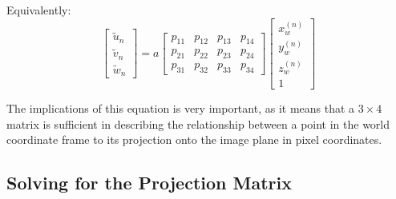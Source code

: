 Equivalently:
\begin{equation} \label{eq:proj}
    \begin{bmatrix}
        \widetilde{u}_n \\ \widetilde{v}_n \\ \widetilde{w}_n
    \end{bmatrix}
    =
    a
    \begin{bmatrix}
        p_{11} & p_{12} & p_{13} & p_{14} \\
        p_{21} & p_{22} & p_{23} & p_{24} \\
        p_{31} & p_{32} & p_{33} & p_{34}
    \end{bmatrix}
    \begin{bmatrix}
        x_w^{(n)} \\ y_w^{(n)} \\ z_w^{(n)} \\ 1
    \end{bmatrix}
\end{equation}

The implications of this equation is very important, as it means that a $3 \times 4$ matrix is sufficient in describing the relationship between a point in the world coordinate frame to its projection onto the image plane in pixel coordinates.

\subsection{Solving for the Projection Matrix}

